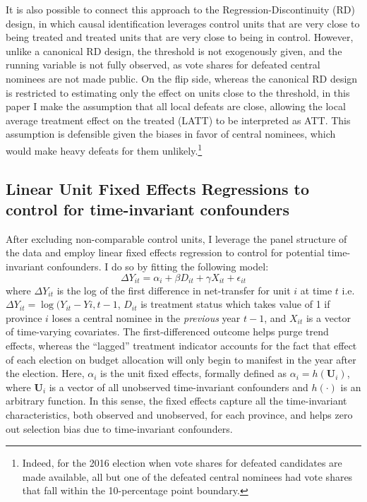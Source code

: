 \documentclass[12pt]{article}\usepackage[]{graphicx}\usepackage[]{color}
\newcommand{\1}{\mathbbm{1}}
\begin{document}
It is also possible to connect this approach to the Regression-Discontinuity (RD) design, in which causal identification leverages control units that are very close to being treated and treated units that are very close to being in control. However, unlike a canonical RD design, the threshold is not exogenously given, and the running variable is not fully observed, as vote shares for defeated central nominees are not made public. On the flip side, whereas the canonical RD design is restricted to estimating only the effect on units close to the threshold, in this paper I make the assumption that all local defeats are close, allowing the local average treatment effect on the treated (LATT) to be interpreted as ATT. This assumption is defensible given the biases in favor of central nominees, which would make heavy defeats for them unlikely.\footnote{Indeed, for the 2016 election when vote shares for defeated candidates are made available, all but one of the defeated central nominees had vote shares that fall within the 10-percentage point boundary. }

\subsection{Linear Unit Fixed Effects Regressions to control for time-invariant confounders}
\label{sec:FE}

After excluding non-comparable control units, I leverage the panel structure of the data and employ linear fixed effects regression to control for potential time-invariant confounders. I do so by fitting the following model:
\begin{equation}
	\Delta Y_{it} = \alpha_i + \beta D_{it} + \gamma X_{it} + \epsilon_{it} \tag{FE}\label{eq:FE}
\end{equation}
where $\Delta Y_{it}$ is the log of the first difference in net-transfer for unit $i$ at time $t$ i.e. $\Delta Y_{it} = \log(Y_{it} - Y{i, t-1}$, $D_{it}$ is treatment status which takes value of 1 if province $i$ loses a central nominee in the \textit{previous} year $t-1$, and $X_{it}$ is a vector of time-varying covariates. The first-differenced outcome helps purge trend effects, whereas the ``lagged'' treatment indicator accounts for the fact that effect of each election on budget allocation will only begin to manifest in the year after the election. Here, $\alpha_i$ is the unit fixed effects, formally defined as $\alpha_i= h(\mathbf{U}_i)$, where $\mathbf{U}_i$ is a vector of all unobserved time-invariant confounders and $h(\cdot)$ is an arbitrary function. In this sense, the fixed effects capture all the time-invariant characteristics, both observed and unobserved, for each province, and helps zero out selection bias due to time-invariant confounders.
\end{document}
